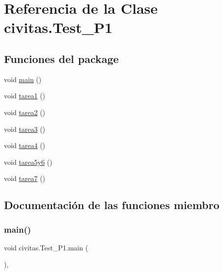 \hypertarget{classcivitas_1_1Test__P1}{}\section{Referencia de la Clase civitas.\+Test\+\_\+\+P1}
\label{classcivitas_1_1Test__P1}
\subsection*{Funciones del \textquotesingle{}package\textquotesingle{}}
\begin{DoxyCompactItemize}
\item 
void \hyperlink{classcivitas_1_1Test__P1_a2c61f6c910b8661f68d6efb55e4d08ab}{main} ()
\item 
void \hyperlink{classcivitas_1_1Test__P1_a7aa52019cc9a17a3a2efe44856a5a514}{tarea1} ()
\item 
void \hyperlink{classcivitas_1_1Test__P1_ae73fcac1620c2440522c0c0710d6d69b}{tarea2} ()
\item 
void \hyperlink{classcivitas_1_1Test__P1_a6c7b74ad56527988f3c43aa1bb89343e}{tarea3} ()
\item 
void \hyperlink{classcivitas_1_1Test__P1_a0aea23eb6f53103dcc12c8e0398c60d3}{tarea4} ()
\item 
void \hyperlink{classcivitas_1_1Test__P1_a2b9689ba61a45af4c82cfafa38834d8a}{tarea5y6} ()
\item 
void \hyperlink{classcivitas_1_1Test__P1_a26a524f5c0aa206cd9f9c154bc39454b}{tarea7} ()
\end{DoxyCompactItemize}


\subsection{Documentación de las funciones miembro}
\mbox{\label{classcivitas_1_1Test__P1_a2c61f6c910b8661f68d6efb55e4d08ab}} 
\subsubsection{\texorpdfstring{main()}{main()}}
{\footnotesize\ttfamily void civitas.\+Test\+\_\+\+P1.\+main (\begin{DoxyParamCaption}{ }\end{DoxyParamCaption})\hspace{0.3cm}{\ttfamily [inline]}, {\ttfamily [package]}}

